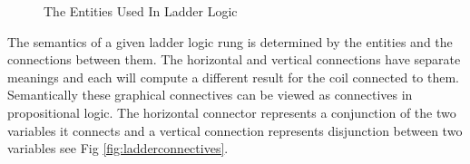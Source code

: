 \medskip

\begin{figure}[h!]
 \begin{center}
\end{center}
\caption{The Entities Used In Ladder Logic}
\label{fig:pelicanladder}
\end{figure}

\medskip

The semantics of a given ladder logic rung is determined by the entities and the connections between them.  The horizontal and vertical connections have separate meanings and each will compute a different result for the coil connected to them.
Semantically these graphical connectives can be viewed as connectives in propositional logic. The horizontal connector represents a conjunction of the two variables it connects and a vertical connection represents disjunction between two variables see Fig \ref{fig:ladderconnectives}.


\begin{comment}
A Ladder logic rung is built using these entities and connections between
them. The shapes of the connections between the contacts determines how the
value of the coil is computed from them. Using propositional logic for comparison,  
a horizontal connection between two contacts represents logical conjunction
and a vertical connection between two contacts represents logical
disjunction see Figure \ref{fig:ladderconnectives}. 
\end{comment}

\medskip

